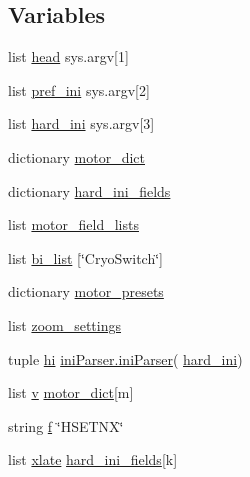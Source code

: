 \subsection*{Variables}
\begin{DoxyCompactItemize}
\item 
list \hyperlink{namespacemk__pgpmac__redis_a760ff4955cbf5beef4ae36a28c30b01a}{head} sys.\-argv\mbox{[}1\mbox{]}
\item 
list \hyperlink{namespacemk__pgpmac__redis_a38c785af5201403976e1267c47ea5096}{pref\-\_\-ini} sys.\-argv\mbox{[}2\mbox{]}
\item 
list \hyperlink{namespacemk__pgpmac__redis_a5864d9c27cbe61534756880cbfebe4f1}{hard\-\_\-ini} sys.\-argv\mbox{[}3\mbox{]}
\item 
dictionary \hyperlink{namespacemk__pgpmac__redis_ad8583d4fe88c4c98af73d2858c51c660}{motor\-\_\-dict}
\item 
dictionary \hyperlink{namespacemk__pgpmac__redis_a8257226983aee079ec66f5cc67e194ec}{hard\-\_\-ini\-\_\-fields}
\item 
list \hyperlink{namespacemk__pgpmac__redis_a7228dc1b6ecec376538db1efe8c05ffb}{motor\-\_\-field\-\_\-lists}
\item 
list \hyperlink{namespacemk__pgpmac__redis_a961bfabfbdcbf5b749f6e6ecdc733619}{bi\-\_\-list} \mbox{[}\char`\"{}Cryo\-Switch\char`\"{}\mbox{]}
\item 
dictionary \hyperlink{namespacemk__pgpmac__redis_a2a04d8d0b7270384d1fac674c29e774a}{motor\-\_\-presets}
\item 
list \hyperlink{namespacemk__pgpmac__redis_ad91bac9be746f99e1cf1f8e28ff348be}{zoom\-\_\-settings}
\item 
tuple \hyperlink{namespacemk__pgpmac__redis_af0e472a4df25fc5c1660ef07226689a8}{hi} \hyperlink{classiniParser_1_1iniParser}{ini\-Parser.\-ini\-Parser}( \hyperlink{namespacemk__pgpmac__redis_a5864d9c27cbe61534756880cbfebe4f1}{hard\-\_\-ini})
\item 
list \hyperlink{namespacemk__pgpmac__redis_ac732d49b0afca9a9951e3a252bae42fc}{v} \hyperlink{namespacemk__pgpmac__redis_ad8583d4fe88c4c98af73d2858c51c660}{motor\-\_\-dict}\mbox{[}m\mbox{]}
\item 
string \hyperlink{namespacemk__pgpmac__redis_a057fe7457503e0de97edcf855591ed58}{f} \char`\"{}H\-S\-E\-T\-N\-X\char`\"{}
\item 
list \hyperlink{namespacemk__pgpmac__redis_afba647feb8fc4d0a364c3dca29af3a22}{xlate} \hyperlink{namespacemk__pgpmac__redis_a8257226983aee079ec66f5cc67e194ec}{hard\-\_\-ini\-\_\-fields}\mbox{[}k\mbox{]}

\end{DoxyCompactItemize}
